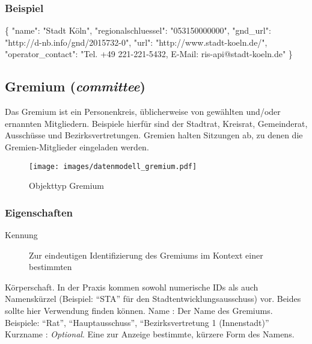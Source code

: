 \documentclass[,a4paper]{article}
\makeatletter
\newenvironment{Shaded}{}{}
\newcommand{\DataTypeTok}[1]{\textcolor[rgb]{0.56,0.13,0.00}{{#1}}}
\newcommand{\StringTok}[1]{\textcolor[rgb]{0.25,0.44,0.63}{{#1}}}
\newcommand{\NormalTok}[1]{{#1}}
\def\maxwidth{\ifdim\Gin@nat@width>\linewidth\linewidth
\else\Gin@nat@width\fi}
\let\Oldincludegraphics\includegraphics
\renewcommand{\includegraphics}[1]{\Oldincludegraphics[width=\maxwidth]{#1}}
\makeatother
\begin{document}
\subsubsection{Beispiel}

\begin{Shaded}
\begin{Highlighting}[]
\NormalTok{\{}
    \DataTypeTok{"name"}\NormalTok{: }\StringTok{"Stadt Köln"}\NormalTok{,}
    \DataTypeTok{"regionalschluessel"}\NormalTok{: }\StringTok{"053150000000"}\NormalTok{,}
    \DataTypeTok{"gnd_url"}\NormalTok{: }\StringTok{"http://d-nb.info/gnd/2015732-0"}\NormalTok{,}
    \DataTypeTok{"url"}\NormalTok{: }\StringTok{"http://www.stadt-koeln.de/"}\NormalTok{,}
    \DataTypeTok{"operator_contact"}\NormalTok{: }\StringTok{"Tel. +49 221-221-5432, E-Mail: ris-api@stadt-koeln.de"}
\NormalTok{\}}
\end{Highlighting}
\end{Shaded}

\subsection{Gremium (\emph{committee})}

Das Gremium ist ein Personenkreis, üblicherweise von gewählten und/oder
ernannten Mitgliedern. Beispiele hierfür sind der Stadtrat, Kreisrat,
Gemeinderat, Ausschüsse und Bezirksvertretungen. Gremien halten
Sitzungen ab, zu denen die Gremien-Mitglieder eingeladen werden.

\begin{figure}[htbp]
\centering
\texttt{[image: images/datenmodell\_gremium.pdf]}
\caption{Objekttyp Gremium}
\end{figure}

\subsubsection{Eigenschaften}

\begin{description}
\item[Kennung]
Zur eindeutigen Identifizierung des Gremiums im Kontext einer bestimmten
\end{description}

Körperschaft. In der Praxis kommen sowohl numerische IDs als auch
Namenskürzel (Beispiel: ``STA'' für den Stadtentwicklungsausschuss) vor.
Beides sollte hier Verwendung finden können. Name : Der Name des
Gremiums. Beispiele: ``Rat'', ``Hauptausschuss'', ``Bezirksvertretung 1
(Innenstadt)'' Kurzname : \emph{Optional}. Eine zur Anzeige bestimmte,
kürzere Form des Namens.
\end{document}
